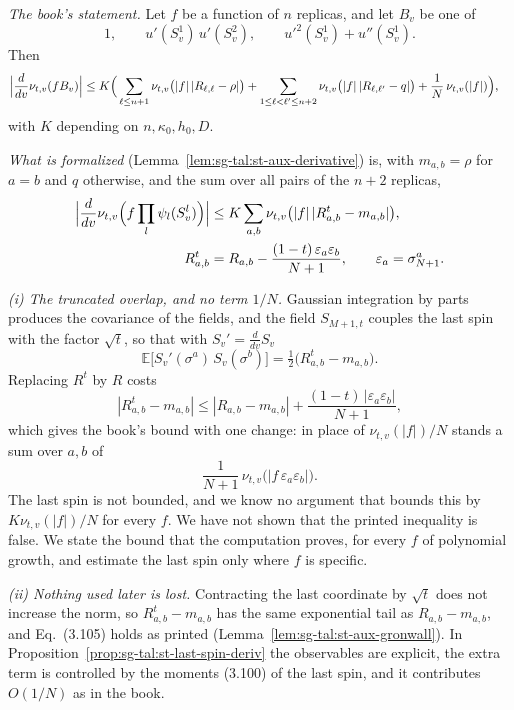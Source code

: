 \begin{remark}\label{rem:sg-tal:st-eq-396}
\emph{The book's statement.} Let $f$ be a function of $n$ replicas, and let $B_v$ be one of
\[
1,\qquad u'(S_v^1)\,u'(S_v^2),\qquad u'^2(S_v^1)+u''(S_v^1).
\]
Then
\begin{align*}
\Bigl|\frac d{dv}\nu_{t,v}(fB_v)\Bigr|\le K\Bigl(&\sum_{\ell\le n+1}\nu_{t,v}\bigl(|f|\,|R_{\ell,\ell}-\rho|\bigr)
+\sum_{1\le\ell<\ell'\le n+2}\nu_{t,v}\bigl(|f|\,|R_{\ell,\ell'}-q|\bigr)
+\frac1N\,\nu_{t,v}(|f|)\Bigr),
\end{align*}
with $K$ depending on $n,\kappa_0,h_0,D$.

\emph{What is formalized} (Lemma~\ref{lem:sg-tal:st-aux-derivative}) is, with $m_{a,b}=\rho$ for $a=b$ and
$q$ otherwise, and the sum over all pairs of the $n+2$ replicas,
\begin{align*}
\Bigl|\frac d{dv}\nu_{t,v}\Bigl(f\prod_l\psi_l(S_v^l)\Bigr)\Bigr|
&\le K\sum_{a,b}\nu_{t,v}\bigl(|f|\,|R^t_{a,b}-m_{a,b}|\bigr),\\
R^t_{a,b}&=R_{a,b}-\frac{(1-t)\,\varepsilon_a\varepsilon_b}{N+1},\qquad\varepsilon_a=\sigma^a_{N+1}.
\end{align*}

\emph{(i) The truncated overlap, and no term $1/N$.} Gaussian integration by parts produces the covariance of the
fields, and the field $S_{M+1,t}$ couples the last spin with the factor $\sqrt t$, so that with
$S_v'=\frac d{dv}S_v$
\[
\mathbb E\bigl[S_v'(\sigma^a)\,S_v(\sigma^b)\bigr]=\tfrac12\bigl(R^t_{a,b}-m_{a,b}\bigr).
\]
Replacing $R^t$ by $R$ costs
\[
|R^t_{a,b}-m_{a,b}|\le|R_{a,b}-m_{a,b}|+\frac{(1-t)\,|\varepsilon_a\varepsilon_b|}{N+1},
\]
which gives the book's bound with one change: in place of $\nu_{t,v}(|f|)/N$ stands a sum over $a,b$ of
\[
\frac1{N+1}\,\nu_{t,v}\bigl(|f\,\varepsilon_a\varepsilon_b|\bigr).
\]
The last spin is not bounded, and we know no argument that bounds this by $K\nu_{t,v}(|f|)/N$ for every $f$. We
have not shown that the printed inequality is false. We state the bound that the computation proves, for every $f$ of polynomial growth,
and estimate the last spin only where $f$ is specific.

\emph{(ii) Nothing used later is lost.} Contracting the last coordinate by $\sqrt t$ does not increase the norm, so
$R^t_{a,b}-m_{a,b}$ has the same exponential tail as $R_{a,b}-m_{a,b}$, and Eq.~(3.105) holds as printed
(Lemma~\ref{lem:sg-tal:st-aux-gronwall}). In Proposition~\ref{prop:sg-tal:st-last-spin-deriv} the observables are
explicit, the extra term is controlled by the moments (3.100) of the last spin, and it contributes $O(1/N)$ as in
the book.


\end{remark}
